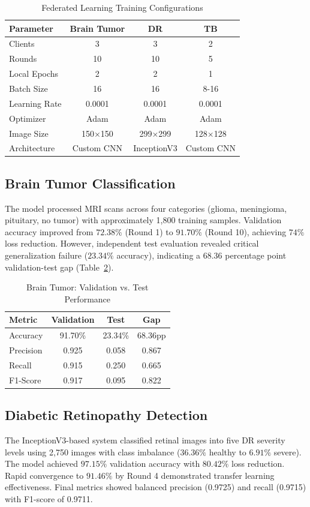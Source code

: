 \documentclass[conference]{IEEEtran}
\begin{document}
\begin{table}[!ht]
\centering
\caption{Federated Learning Training Configurations}
\label{tab:config}
\begin{tabular}{|l|c|c|c|}
\hline
\textbf{Parameter} & \textbf{Brain Tumor} & \textbf{DR} & \textbf{TB} \\
\hline
Clients & 3 & 3 & 2 \\
Rounds & 10 & 10 & 5 \\
Local Epochs & 2 & 2 & 1 \\
Batch Size & 16 & 16 & 8-16 \\
Learning Rate & 0.0001 & 0.0001 & 0.0001 \\
Optimizer & Adam & Adam & Adam \\
Image Size & 150×150 & 299×299 & 128×128 \\
Architecture & Custom CNN & InceptionV3 & Custom CNN \\
\hline
\end{tabular}
\end{table}

\subsection{Brain Tumor Classification}
The model processed MRI scans across four categories (glioma, meningioma, pituitary, no tumor) with approximately 1,800 training samples. Validation accuracy improved from $72.38\%$ (Round 1) to $91.70\%$ (Round 10), achieving $74\%$ loss reduction. However, independent test evaluation revealed critical generalization failure ($23.34\%$ accuracy), indicating a 68.36 percentage point validation-test gap (Table~\ref{tab:brain_test}).

\begin{table}[!ht]
\centering
\caption{Brain Tumor: Validation vs. Test Performance}
\label{tab:brain_test}
\begin{tabular}{|l|c|c|c|}
\hline
\textbf{Metric} & \textbf{Validation} & \textbf{Test} & \textbf{Gap} \\
\hline
Accuracy & 91.70\% & 23.34\% & 68.36pp \\
Precision & 0.925 & 0.058 & 0.867 \\
Recall & 0.915 & 0.250 & 0.665 \\
F1-Score & 0.917 & 0.095 & 0.822 \\
\hline
\end{tabular}
\end{table}

\subsection{Diabetic Retinopathy Detection}
The InceptionV3-based system classified retinal images into five DR severity levels using 2,750 images with class imbalance ($36.36\%$ healthy to $6.91\%$ severe). The model achieved $97.15\%$ validation accuracy with $80.42\%$ loss reduction. Rapid convergence to $91.46\%$ by Round 4 demonstrated transfer learning effectiveness. Final metrics showed balanced precision (0.9725) and recall (0.9715) with F1-score of 0.9711.
\end{document}
